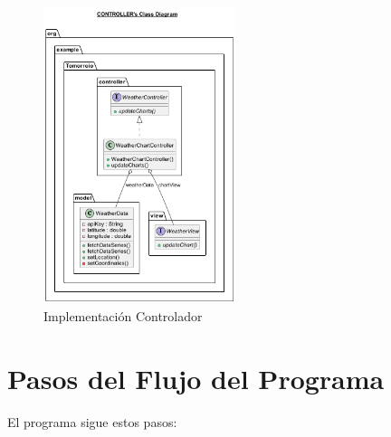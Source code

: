 \documentclass{article}
\begin{document}
\begin{figure}[H]
  \centering
  \includegraphics[width=0.5\textwidth]{images/image3.png}
  \caption {Implementación Controlador}
  \label{fig:image3}
\end{figure}

\section{Pasos del Flujo del Programa}
El programa sigue estos pasos:
\end{document}
